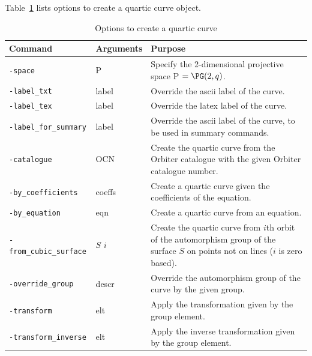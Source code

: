 Table~\ref{tab:quartic:curves:create} lists options to create a quartic curve object.
\begin{table}
\begin{center}
\begin{tabular}{|p{4cm}|p{3cm}|p{8cm}|}
\hline
Command & Arguments & Purpose \\
\hline
\hline
\verb'-space' & P & Specify the 2-dimensional projective space P $=\PG(2,q)$. \\
\hline
\verb'-label_txt' & label & Override the ascii label of the curve. \\
\hline
\verb'-label_tex' & label & Override the latex label of the curve. \\
\hline
\verb'-label_for_summary' & label & Override the ascii label of the curve, to be used in summary commands. \\
\hline
\verb'-catalogue' & OCN & Create the quartic curve from the Orbiter catalogue with the given Orbiter catalogue number.\\
\hline
\verb'-by_coefficients' & coeffs & Create a quartic curve given the coefficients of the equation. \\
\hline
\verb'-by_equation' & eqn & Create a quartic curve from an equation. \\
\hline
\verb'-from_cubic_surface' & $S$ $i$ & Create the quartic curve from $i$th orbit of the automorphism group of the surface $S$ on points not on lines ($i$ is zero based). \\
\hline
\verb'-override_group' & descr & Override the automorphism group of the curve by the given group. \\
\hline
\verb'-transform' & elt & Apply the transformation given by the group element. \\
\hline
\verb'-transform_inverse' & elt & Apply the inverse transformation given by the group element. \\
\hline
\end{tabular}
\end{center}
\caption{\label{tab:quartic:curves:create}Options to create a quartic curve}
\end{table}


